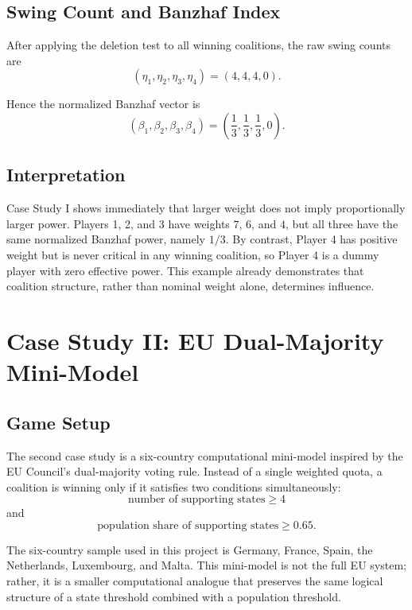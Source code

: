 \documentclass[lettersize,journal]{IEEEtran}
\begin{document}
\subsection{Swing Count and Banzhaf Index}
After applying the deletion test to all winning coalitions, the raw swing counts are
\begin{equation}
(\eta_1,\eta_2,\eta_3,\eta_4)=(4,4,4,0).
\end{equation}

Hence the normalized Banzhaf vector is
\begin{equation}
(\beta_1,\beta_2,\beta_3,\beta_4)=\left(\frac{1}{3},\frac{1}{3},\frac{1}{3},0\right).
\end{equation}

\subsection{Interpretation}
Case Study I shows immediately that larger weight does not imply proportionally larger power. Players 1, 2, and 3 have weights $7$, $6$, and $4$, but all three have the same normalized Banzhaf power, namely $1/3$. By contrast, Player 4 has positive weight but is never critical in any winning coalition, so Player 4 is a dummy player with zero effective power. This example already demonstrates that coalition structure, rather than nominal weight alone, determines influence.

\section{Case Study II: EU Dual-Majority Mini-Model}

\subsection{Game Setup}
The second case study is a six-country computational mini-model inspired by the EU Council's dual-majority voting rule. Instead of a single weighted quota, a coalition is winning only if it satisfies two conditions simultaneously:
\begin{equation}
\text{number of supporting states}\ge 4
\end{equation}
and
\begin{equation}
\text{population share of supporting states}\ge 0.65.
\end{equation}

The six-country sample used in this project is Germany, France, Spain, the Netherlands, Luxembourg, and Malta. This mini-model is not the full EU system; rather, it is a smaller computational analogue that preserves the same logical structure of a state threshold combined with a population threshold.
\end{document}
